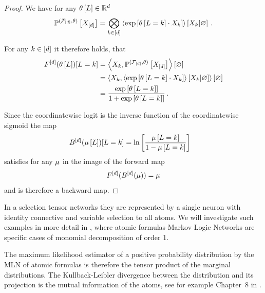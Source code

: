 \begin{proof}
	We have for any $\theta\left[L\right]\in\mathbb{R}^{d}$
		\[ \mathbb{P}^{(\mathcal{F}_{[d]},\theta)}\left[X_{[d]}\right] 
		= \bigotimes_{k\in[d]} \left\langle \mathrm{exp}\left[\theta\left[L=k\right]\cdot X_{k}\right]\right\rangle \left[ X_{k} | \varnothing \right]  \, . \]

	
	For any $k\in[d]$ it therefore holds, that
	\begin{align*}
		F^{[d]}(\theta\left[L\right])[L=k] 
		&=\left\langle X_{k},  \mathbb{P}^{(\mathcal{F}_{[d]},\theta)}\left[X_{[d]}\right]\right\rangle \left[ \varnothing \right] \\
		&=\left\langle X_{k},  \left\langle \mathrm{exp}\left[\theta\left[L=k\right]\cdot X_{k}\right]\right\rangle \left[ X_{k} | \varnothing \right]\right\rangle \left[ \varnothing \right] \\
		& = \frac{\mathrm{exp}\left[\theta\left[L=k\right]\right]}{1+\mathrm{exp}\left[\theta\left[L=k\right]\right]} \, .
	\end{align*}

	Since the coordinatewise logit is the inverse function of the coordinatewise sigmoid the map
	\begin{align*}
		B^{[d]}(\mu\left[L\right])[L=k] 
		& = \ln \left[ \frac{\mu\left[L=k\right]}{1- \mu\left[L=k\right]} \right]
	\end{align*}
	satisfies for any $\mu$ in the image of the forward map
	\begin{align*}
		F^{[d]}(B^{[d]}(\mu)) = \mu 
	\end{align*}
	and is therefore a backward map.
\end{proof}


In a selection tensor networks they are represented by a single neuron with identity connective and variable selection to all atoms.
We will investigate such examples in more detail in , where atomic formulas Markov Logic Networks are specific cases of monomial decomposition of order 1.
	
The maximum likelihood estimator of a positive probability distribution by the MLN of atomic formulas is therefore the tensor product of the marginal distributions.
The Kullback-Leibler divergence between the distribution and its projection is the mutual information of the atoms, see for example Chapter~8 in \cite{mackay_information_2003}.

